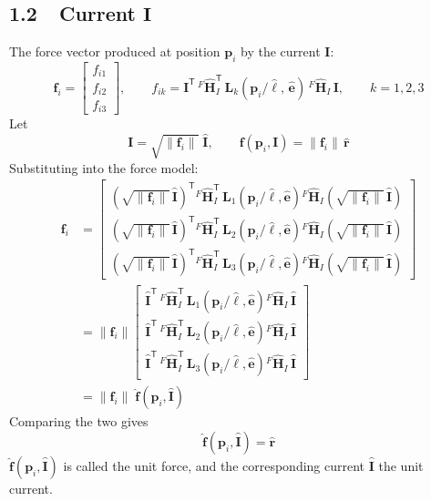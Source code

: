 \documentclass[11pt]{article}
\newcommand{\rh}{\hat{\mathbf{r}}}
\newcommand{\Ij}{\mathbf{I}}
\newcommand{\Ijh}{\hat{\mathbf{I}}}
\newcommand{\fij}{\mathbf{f}_{i}}
\begin{document}
\subsection*{1.2\ \ Current $\Ij$}

The force vector produced at position $\mathbf{p}_i$ by the current $\Ij$:
\[
\fij=\begin{bmatrix} f_{i1}\\ f_{i2}\\ f_{i3} \end{bmatrix},\qquad
f_{ik}=\Ij^{\mathsf T}\,{}^{F}\hat{\mathbf{H}}_{I}^{\mathsf T}\,
\mathbf{L}_k\!\left(\mathbf{p}_i/\hat{\ell},\,\hat{\mathbf{e}}\right)\,{}^{F}\hat{\mathbf{H}}_{I}\,\Ij,
\qquad k=1,2,3
\]
Let
\[
\Ij=\sqrt{\|\fij\|}\;\Ijh,\qquad
\mathbf{f}\!\left(\mathbf{p}_i,\Ij\right)=\|\fij\|\,\rh
\]
Substituting into the force model:
\[
\begin{aligned}
\fij
&=\begin{bmatrix}
\left(\sqrt{\|\fij\|}\,\Ijh\right)^{\!\mathsf T}{}^{F}\hat{\mathbf{H}}_{I}^{\mathsf T}\,\mathbf{L}_1\!\left(\mathbf{p}_i/\hat{\ell},\hat{\mathbf{e}}\right){}^{F}\hat{\mathbf{H}}_{I}\left(\sqrt{\|\fij\|}\,\Ijh\right)\\[2pt]
\left(\sqrt{\|\fij\|}\,\Ijh\right)^{\!\mathsf T}{}^{F}\hat{\mathbf{H}}_{I}^{\mathsf T}\,\mathbf{L}_2\!\left(\mathbf{p}_i/\hat{\ell},\hat{\mathbf{e}}\right){}^{F}\hat{\mathbf{H}}_{I}\left(\sqrt{\|\fij\|}\,\Ijh\right)\\[2pt]
\left(\sqrt{\|\fij\|}\,\Ijh\right)^{\!\mathsf T}{}^{F}\hat{\mathbf{H}}_{I}^{\mathsf T}\,\mathbf{L}_3\!\left(\mathbf{p}_i/\hat{\ell},\hat{\mathbf{e}}\right){}^{F}\hat{\mathbf{H}}_{I}\left(\sqrt{\|\fij\|}\,\Ijh\right)
\end{bmatrix}\\[6pt]
&=\|\fij\|
\begin{bmatrix}
\Ijh^{\mathsf T}\,{}^{F}\hat{\mathbf{H}}_{I}^{\mathsf T}\,\mathbf{L}_1\!\left(\mathbf{p}_i/\hat{\ell},\hat{\mathbf{e}}\right){}^{F}\hat{\mathbf{H}}_{I}\,\Ijh\\[2pt]
\Ijh^{\mathsf T}\,{}^{F}\hat{\mathbf{H}}_{I}^{\mathsf T}\,\mathbf{L}_2\!\left(\mathbf{p}_i/\hat{\ell},\hat{\mathbf{e}}\right){}^{F}\hat{\mathbf{H}}_{I}\,\Ijh\\[2pt]
\Ijh^{\mathsf T}\,{}^{F}\hat{\mathbf{H}}_{I}^{\mathsf T}\,\mathbf{L}_3\!\left(\mathbf{p}_i/\hat{\ell},\hat{\mathbf{e}}\right){}^{F}\hat{\mathbf{H}}_{I}\,\Ijh
\end{bmatrix}\\[6pt]
&=\|\fij\|\;\hat{\mathbf{f}}\!\left(\mathbf{p}_i,\Ijh\right)
\end{aligned}
\]
Comparing the two gives
\[
\hat{\mathbf{f}}\!\left(\mathbf{p}_i,\Ijh\right)=\rh
\]
$\hat{\mathbf{f}}(\mathbf{p}_i,\Ijh)$ is called the unit force, and the corresponding current $\Ijh$ the unit current.
\end{document}
